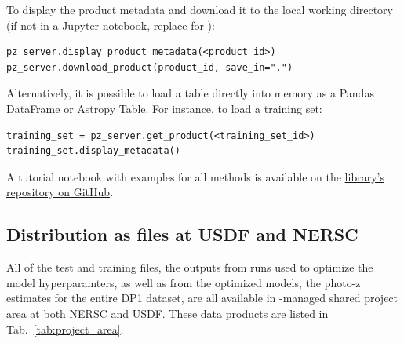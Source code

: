 To display the product metadata and download it to the local working directory (if not in a Jupyter notebook, replace  for ):   
\begin{verbatim}
pz_server.display_product_metadata(<product_id>)
pz_server.download_product(product_id, save_in=".")
\end{verbatim}

Alternatively, it is possible to load a table directly into memory as a Pandas DataFrame or Astropy Table. For instance, to load a training set:  

\begin{verbatim}
training_set = pz_server.get_product(<training_set_id>)
training_set.display_metadata()
\end{verbatim}


A tutorial notebook with examples for all  methods is available on the \href{https://github.com/linea-it/pzserver/blob/main/docs/notebooks/pzserver_tutorial.ipynb}{ library's repository on GitHub}.


\subsection{Distribution as files at USDF and NERSC}
\label{sec:distribution:files}

All of the test and training files, the outputs from runs used to optimize the model hyperparamters, as well as from the optimized models, the photo-z estimates for the entire DP1 dataset, are all available in -managed shared project area at both NERSC and USDF.  These data products are listed in Tab.~\ref{tab:project_area}.

